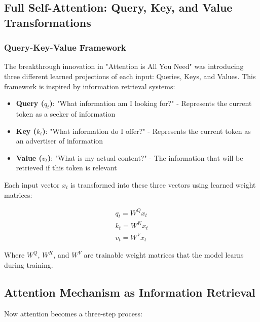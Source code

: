 \subsection{Full Self-Attention: Query, Key, and Value Transformations}

\subsubsection{Query-Key-Value Framework}

The breakthrough innovation in "Attention is All You Need" \cite{vaswani2017attention} was introducing three different learned projections of each input: Queries, Keys, and Values. This framework is inspired by information retrieval systems:

\begin{itemize}
  \item \textbf{Query ($q_t$)}: "What information am I looking for?" - Represents the current token as a seeker of information
  \item \textbf{Key ($k_t$)}: "What information do I offer?" - Represents the current token as an advertiser of information
  \item \textbf{Value ($v_t$)}: "What is my actual content?" - The information that will be retrieved if this token is relevant
\end{itemize}

Each input vector $x_t$ is transformed into these three vectors using learned weight matrices:

\begin{gather*}
  q_t = W^Q x_t\\
  k_t = W^K x_t\\
  v_t = W^V x_t
\end{gather*}

Where $W^Q$, $W^K$, and $W^V$ are trainable weight matrices that the model learns during training.

\subsection{Attention Mechanism as Information Retrieval}

Now attention becomes a three-step process:

